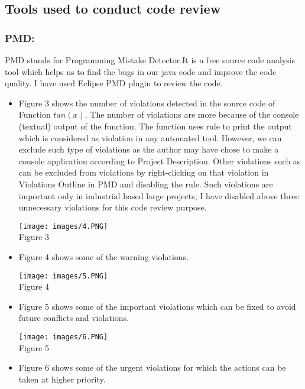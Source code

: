 \documentclass[10pt,letterpaper]{article}
\begin{document}
\subsection{Tools used to conduct code review}
\subsubsection{PMD:}
PMD stands for Programming Mistake Detector.It is a free source code analysis tool which helps us to find the bugs in our java code and improve the code quality. I have used Eclipse PMD plugin to review the code.
\begin{itemize}
    \item Figure 3 shows the number of violations detected in the source code of Function $tan(x)$. The number of violations are more because of the console (textual) output of the function. The function uses  rule to print the output which is considered as violation in any automated tool. However, we can exclude such type of violations as the author may have chose to make a console application according to Project Description. Other violations such as  can be excluded from violations by right-clicking on that violation in Violations Outline in PMD and disabling the rule. Such violations are important only in industrial based large projects, I have disabled above three unnecessary violations for this code review purpose.
\begin{center}
    \texttt{[image: images/4.PNG]}\\
    \caption{Figure 3}
\end{center} 
    \item Figure 4 shows some of the warning violations. 
    \begin{center}
    \texttt{[image: images/5.PNG]}\\
    \caption{Figure 4}
\end{center} 
\item Figure 5 shows some of the important violations which can be fixed to avoid future conflicts and violations.  
    \begin{center}
    \texttt{[image: images/6.PNG]}\\
    \caption{Figure 5}
\end{center}
\item Figure 6 shows some of the urgent violations for which the actions can be taken at higher priority.  

\end{itemize}
\end{document}
